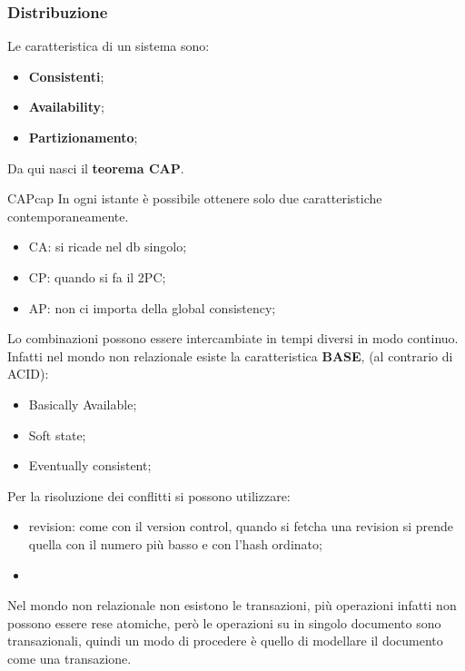 \documentclass[12pt]{article}
\begin{document}
\subsubsection{Distribuzione}
Le caratteristica di un sistema sono:
\begin{itemize}
    \item \textbf{Consistenti};
    \item \textbf{Availability};
    \item \textbf{Partizionamento};
\end{itemize}
Da qui nasci il \textbf{teorema CAP}.
\begin{theorem}{CAP}{cap}
    In ogni istante \`e possibile ottenere solo due caratteristiche contemporaneamente.
\end{theorem}
\begin{itemize}
    \item CA: si ricade nel db singolo;
    \item CP: quando si fa il 2PC;
    \item AP: non ci importa della global consistency;
\end{itemize}
Lo combinazioni possono essere intercambiate in tempi diversi in modo continuo. Infatti nel mondo non relazionale esiste la caratteristica \textbf{BASE}, (al contrario di ACID):
\begin{itemize}
    \item Basically Available;
    \item Soft state;
    \item Eventually consistent;
\end{itemize}
Per la risoluzione dei conflitti si possono utilizzare:
\begin{itemize}
    \item revision: come con il version control, quando si fetcha una revision si prende quella con il numero pi\`u basso e con l'hash ordinato;
    \item 
\end{itemize}


Nel mondo non relazionale non esistono le transazioni, pi\`u operazioni infatti non possono essere rese atomiche, per\`o le operazioni su in singolo documento sono transazionali, quindi un modo di procedere \`e quello di modellare il documento come una transazione.
\end{document}
